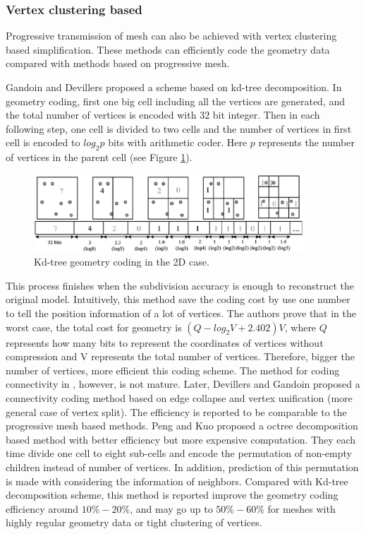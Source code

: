 \documentclass[11pt, a4paper]{report}
\begin{document}
    \subsubsection*{Vertex clustering based}
    Progressive transmission of mesh can also be achieved with vertex
    clustering based simplification. These methods can efficiently
    code the geometry data compared with methods based on progressive
    mesh.

    Gandoin and Devillers \cite{566591} proposed a scheme based on
    kd-tree decomposition. In geometry coding, first one big cell
    including all the vertices are generated, and the total number of
    vertices is encoded with 32 bit integer. Then in each following
    step, one cell is divided to two cells and the number of vertices
    in first cell is encoded to $log_{2}p$ bits with arithmetic coder.
    Here $p$ represents the number of vertices in the parent cell (see Figure \ref{kdtree}).
    \begin{figure}
    \centering
    \includegraphics[width=0.9\textwidth]{kdtree.eps}
    \caption{Kd-tree geometry coding in the 2D case.\cite{technologies:peng}}\label{kdtree}
    \end{figure}
    This process finishes when the subdivision accuracy is enough to
    reconstruct the original model. Intuitively, this method save the
    coding cost by use one number to tell the position information of
    a lot of vertices. The authors prove that in the worst case, the
    total cost for geometry is $(Q - log_{2}V + 2.402)V$, where $Q$
    represents how many bits to represent the coordinates of vertices
    without compression and V represents the total number of vertices.
    Therefore, bigger the number of vertices, more efficient this coding scheme. 
    The method for coding connectivity in \cite{566591}, however, is not mature. 
    Later, Devillers and Gandoin
    \cite{devillers00geometric} proposed a connectivity coding method based on edge
    collapse and vertex unification (more
    general case of vertex split). The efficiency is reported to be 
    comparable to the progressive mesh based methods. Peng and Kuo
    \cite{1073237} proposed a octree decomposition based method with
    better efficiency but more expensive computation. They each time
    divide one cell to eight sub-cells and encode the permutation of
    non-empty children instead of number of vertices. In addition,
    prediction of this permutation is made with considering the
    information of neighbors. Compared with Kd-tree decomposition
    scheme, this method is reported improve the geometry coding
    efficiency around $10\%-20\%$, and may go up to $50\%-60\%$ for
    meshes with highly regular geometry data or tight clustering of
    vertices.
\end{document}
